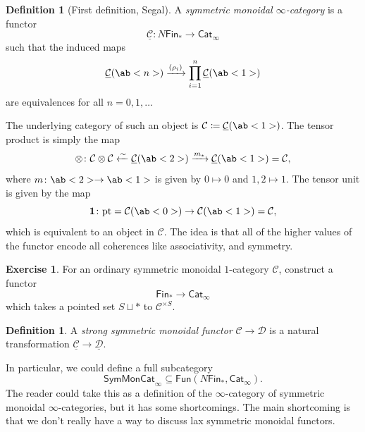\documentclass[10pt, oneside]{memoir}
\theoremstyle{definition}
\newtheorem{defn}[thm]{Definition}
\newtheorem{exer}[thm]{Exercise}
\theoremstyle{remark}
\theoremstyle{plain}
\theoremstyle{definition}
\theoremstyle{remark}
\newcommand{\mc}[1]{\mathcal{#1}}
\newcommand{\mr}[1]{\mathrm{#1}}
\newcommand{\ms}[1]{\mathsf{#1}}
\newcommand{\ul}[1]{\underline{#1}}
\newcommand{\1}{\mathbf{1}}
\newcommand{\2}{\mathbf{2}}
\newcommand{\3}{\mathbf{3}}
\newcommand{\pt}{\mr{pt}}
\begin{document}
\begin{defn}[First definition, Segal]
    A \textit{symmetric monoidal \(\infty \)-category} is a functor
    \[ \ul{\mc{C}} \colon N \ms{Fin}_* \to \ms{Cat}_{\infty} \]
    such that the induced maps
    \[ \ul{\mc{C}}(\ab<n>) \xrightarrow{(\rho_i)} \prod_{i=1}^n \ul{\mc{C}}(\ab<1>) \]
    are equivalences for all \(n = 0, 1, \ldots \)
\end{defn}

The underlying category of such an object is \(\mc{C} \coloneqq \ul{\mc{C}}(\ab<1>) \). The tensor product is simply the map
\[ \otimes \colon \mc{C} \otimes \mc{C} \xleftarrow{\sim} \ul{\mc{C}}(\ab<2>) \xrightarrow{m_*} \ul{\mc{C}}(\ab<1>)= \mc{C}, \]
where \(m \colon \ab<2> \to \ab<1> \) is given by \(0 \mapsto 0 \) and \(1,2 \mapsto 1 \). The tensor unit is given by the map
\[ \1 \colon \pt = \mc{C}(\ab<0>) \to \mc{C}(\ab<1>) = \mc{C}, \]
which is equivalent to an object in \(\mc{C} \). The idea is that all of the higher values of the functor encode all coherences like associativity, and symmetry.

\begin{exer}
    For an ordinary symmetric monoidal \(1 \)-category \(\mc{C} \), construct a functor
    \[ \ms{Fin}_* \to \ms{Cat}_{\infty} \]
    which takes a pointed set \(S \sqcup * \) to \(\mc{C}^{\times S} \).
\end{exer}

\begin{defn}
    A \textit{strong symmetric monoidal functor} \(\mc{C} \to \mc{D} \) is a natural transformation \(\ul{\mc{C}} \to \ul{\mc{D}} \).
\end{defn}

In particular, we could define a full subcategory
\[ \ms{SymMonCat}_{\infty} \subseteq \ms{Fun}(N\ms{Fin}_*, \ms{Cat}_{\infty}). \]
The reader could take this as a definition of the \(\infty \)-category of symmetric monoidal \(\infty \)-categories, but it has some shortcomings. The main shortcoming is that we don't really have a way to discuss lax symmetric monoidal functors.
\end{document}
